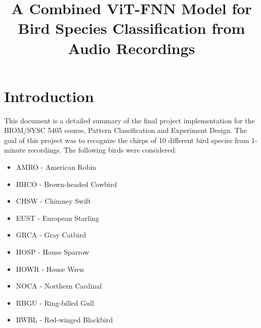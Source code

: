\documentclass[12pt, conference]{IEEEtran}
\begin{document}
\title{A Combined ViT-FNN Model for Bird Species Classification from Audio Recordings}

\author{
\and
{}
\and
{}
\and
{}
}

\maketitle

\doublespacing

\section{Introduction}
This document is a detailed summary of the final project implementation for the BIOM/SYSC 5405 course, Pattern Classification and Experiment Design. The goal of this project was to recognize the chirps of 10 different bird species from 1-minute recordings. The following birds were considered: 
\begin{itemize}
\item AMRO - American Robin
\item BHCO - Brown-headed Cowbird
\item CHSW - Chimney Swift
\item EUST - European Starling
\item GRCA - Gray Catbird
\item HOSP - House Sparrow
\item HOWR - House Wren
\item NOCA - Northern Cardinal
\item RBGU - Ring-billed Gull
\item RWBL - Red-winged Blackbird
\end{itemize}
\end{document}
